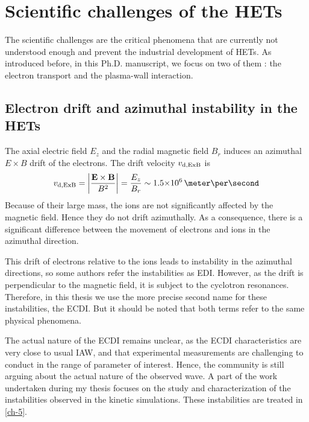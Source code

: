 
\section{Scientific challenges of the HETs}

The scientific challenges are the critical phenomena that are currently not understood enough and prevent the industrial development of \ac{HET}s.
As introduced before, in this Ph.D. manuscript, we focus on two of them : the electron transport and the plasma-wall interaction.


\subsection{Electron drift and azimuthal instability in the HETs}

The axial electric field $E_z$ and the radial magnetic field $B_r$ induces an azimuthal $E\times B$ drift of the electrons.
The drift velocity $v_{\rm d, ExB}$ is 
\begin{equation} \label{eq-exbdriftbis}
  v_{\rm d, ExB} = \bigg\lvert \frac{\vect{E} \times \vect{B}}{B^2} \bigg\rvert = \frac{E_z}{B_r} \sim \sn{1.5}{6} \,\meter\per\second
\end{equation}
Because of their large mass, the ions are not significantly affected by the magnetic field.
Hence they do not drift azimuthally.
As a consequence, there is a significant difference between the movement of electrons and ions in the azimuthal direction.

This drift of electrons relative to the ions leads to instability in the azimuthal directions, so some  authors refer the instabilities as \ac{EDI}.
However, as the drift is perpendicular to the magnetic field, it is subject to the cyclotron resonances.
Therefore, in this thesis we use the more precise second name for these instabilities, the \ac{ECDI}.
But it should be noted that both terms refer to the same physical phenomena.

The actual nature of the \ac{ECDI} remains unclear\citep{boeuf2018}, as the \ac{ECDI} characteristics are very close to usual \ac{IAW}, and that experimental measurements are challenging to conduct in the range of parameter of interest.
Hence, the community is still arguing about the actual nature of the observed wave.
A part of the work undertaken during my thesis focuses on the study and characterization of the instabilities observed in the kinetic simulations.
These instabilities are treated in \cref{ch-5}.


